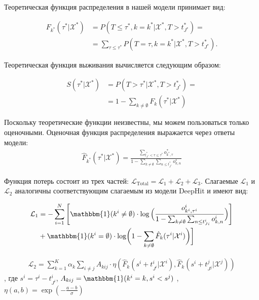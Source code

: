 \documentclass[a4paper,14pt,oneside,openany]{memoir}
\begin{document}
Теоретическая функция распределения в нашей модели принимает вид:

\begin{equation}
	\begin{aligned}
		F_{k^{*}}(\tau^{*}|\mathcal{X}^{*}) & = P(T\leq\tau^{*},k=k^{*}|\mathcal{X}^{*},T>t_{J^{*}}^{*}) = \\
		& =\sum_{\tau\leq\tau^*}P(T=\tau,k=k^*|\mathcal{X}^*,T>t_{J^*}^*).
	\end{aligned}
\end{equation}

Теоретическая функция выживания вычисляется следующим образом:

\begin{equation}
	\begin{aligned}
		S(\tau^{*}|\mathcal{X}^{*}) & = 
		P(T>\tau^*|\mathcal{X}^*,T>t_{J^*}^*) =\\
		& =1-\sum_{k\neq\emptyset}F_k(\tau^*|\mathcal{X}^*)
	\end{aligned}
\end{equation}

Поскольку теоретические функции неизвестны, мы можем пользоваться только оценочными. Оценочная функция распределения выражается через ответы модели:
\begin{equation}
	\begin{aligned}
		\hat{F}_{k^*}(\tau^*|\mathcal{X}^*)=\frac{\sum_{t_{J^*}^*<\tau\leq\tau^*}o_{k^*,\tau}^*}{1-\sum_{k\neq\emptyset}\sum_{n\leq t_{J^*}^*}o_{k,n}^*}
	\end{aligned}
\end{equation}

Функция потерь состоит из трех частей: $\mathcal{L}_{\mathrm{Total}}=\mathcal{L}_1+\mathcal{L}_2+\mathcal{L}_3$. Слагаемые $\mathcal{L}_1$ и $\mathcal{L}_2$ аналогичны соответствующим слагаемым из модели DeepHit и имеют вид: 

\begin{equation}
	\begin{aligned}
		\mathcal{L}_{1} & =-\sum_{i=1}^N\left[\mathbbm{1}(k^i\neq\emptyset)\cdot\log\Big(\frac{o_{k^i,\tau^i}^i}{1-\sum_{k\neq\emptyset}\sum_{n\leq t_{Ji}^i}o_{k,n}^i}\Big)\right] \\
		& +\mathbbm{1}(k^i=\emptyset)\cdot\log\biggl(1-\sum_{k\neq\emptyset}\hat{F}_k(\tau^i|\mathcal{X}^i)\biggr)\biggr]
	\end{aligned}
\end{equation}

\begin{equation}
	\begin{aligned}
		\mathcal{L}_2=\sum_{k=1}^K\alpha_k\sum_{i\neq j}A_{kij}\cdot\eta\left(\hat{F}_k(s^i+t_{J^i}^i|\mathcal{X}^i),\hat{F}_k(s^i+t_{J^j}^j|\mathcal{X}^j)\right)
	\end{aligned}
\end{equation}
, где $s^i=\tau^i-t_{J^i}^i$, $A_{kij}=\mathbbm{1}(k^i=k,s^i<s^j)$ , $\eta(a,b)=\exp\left(-\frac{a-b}{\sigma}\right)$
\end{document}
